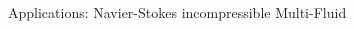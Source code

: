 \documentclass[final,utf8,,hyperref={pdfpagelabels=false}]{beamer}
\newcommand{\goodgap}{%
  \hspace{\subfigtopskip}%
  \hspace{\subfigbottomskip}}
\begin{document}
\begin{frame}[containsverbatim]{}
\begin{columns}[t]
\begin{block}{Applications: Navier-Stokes incompressible Multi-Fluid}
    \begin{columns}[t]
      \begin{column}{.45\textwidth}
        \begin{figure}
      \centering
      \goodgap
      \\
      \goodgap
      \\

\end{figure}
\end{column}
\end{columns}
\end{block}
\end{columns}
\end{frame}
\end{document}
